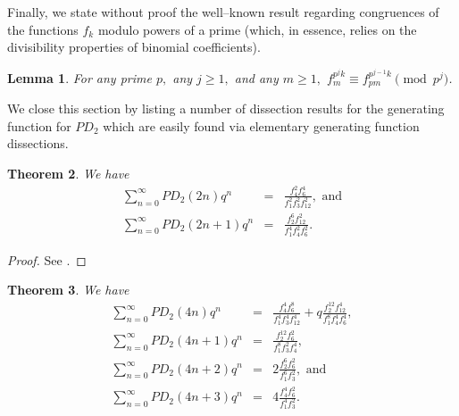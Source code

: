 \documentclass{amsart}
\newtheorem{theorem}{Theorem}[section]
\newtheorem{lemma}[theorem]{Lemma}
\begin{document}
Finally, we state without proof the well--known result regarding congruences of the functions $f_k$ modulo powers of a prime (which, in essence, relies on the divisibility properties of binomial coefficients).  
\begin{lemma}
\label{general_congs_result}    
For any prime $p,$ any $j\geq 1,$ and any $m\geq 1,$
$f_{m}^{p^jk} \equiv f_{pm}^{p^{j-1}k} \pmod{p^j}$.
\end{lemma}

We close this section by listing a number of dissection results for the generating function for $PD_2$ which are easily found via elementary generating function dissections.  

\begin{theorem}
\label{2-dissections}    
We have 
\begin{eqnarray*}
\sum_{n=0}^{\infty} PD_2(2n)q^n
&=& 
\frac{f_4^2f_6^4}{f_1^2f_3^2f_{12}^2}, \textrm{\ \ \ and} \\
\sum_{n=0}^{\infty} PD_2(2n+1)q^n
&=& 
\frac{f_2^6f_{12}^2}{f_1^4f_4^2f_{6}^2}.
\end{eqnarray*}
\end{theorem}
\begin{proof}
See \cite[Theorem 21]{ALL}.    
\end{proof}
\begin{theorem}
\label{4-dissections}    
We have 
\begin{eqnarray*}
\sum_{n=0}^{\infty} PD_2(4n)q^n
&=& 
\frac{f_4^4f_6^8}{f_1^4f_3^4f_{12}^4} + q\frac{f_2^{12}f_{12}^4}{f_1^8f_4^4f_6^4}, \\
\sum_{n=0}^{\infty} PD_2(4n+1)q^n
&=& 
\frac{f_2^{12}f_6^2}{f_1^8f_3^2f_4^4}, \\
\sum_{n=0}^{\infty} PD_2(4n+2)q^n
&=& 
2\frac{f_2^6f_6^2}{f_1^6f_3^2}, \textrm{\ \ \ and} \\
\sum_{n=0}^{\infty} PD_2(4n+3)q^n
&=& 
4\frac{f_4^4f_6^2}{f_1^4f_3^2}.
\end{eqnarray*}
\end{theorem}
\end{document}
